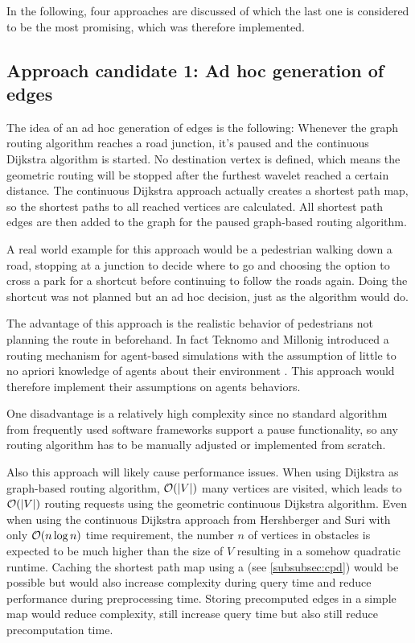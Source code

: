 	In the following, four approaches are discussed of which the last one is considered to be the most promising, which was therefore implemented.
	
	\subsection{Approach candidate 1: Ad hoc generation of edges}
	
		The idea of an ad hoc generation of edges is the following:
		Whenever the graph routing algorithm reaches a road junction, it's paused and the continuous Dijkstra algorithm is started.
		No destination vertex is defined, which means the geometric routing will be stopped after the furthest wavelet reached a certain distance.
		The continuous Dijkstra approach actually creates a shortest path map, so the shortest paths to all reached vertices are calculated.
		All shortest path edges are then added to the graph for the paused graph-based routing algorithm.
		
		A real world example for this approach would be a pedestrian walking down a road, stopping at a junction to decide where to go and choosing the option to cross a park for a shortcut before continuing to follow the roads again.
		Doing the shortcut was not planned but an ad hoc decision, just as the algorithm would do.
		
		The advantage of this approach is the realistic behavior of pedestrians not planning the route in beforehand.
		In fact Teknomo and Millonig introduced a routing mechanism for agent-based simulations with the assumption of little to no apriori knowledge of agents about their environment \cite{teknomo-millonig-routing}.
		This approach would therefore implement their assumptions on agents behaviors.
		
		One disadvantage is a relatively high complexity since no standard algorithm from frequently used software frameworks support a pause functionality, so any routing algorithm has to be manually adjusted or implemented from scratch.
		
		Also this approach will likely cause performance issues.
		When using Dijkstra as graph-based routing algorithm, $\mathcal{O}(|V|)$ many vertices are visited, which leads to $\mathcal{O}(|V|)$ routing requests using the geometric continuous Dijkstra algorithm.
		Even when using the continuous Dijkstra approach from Hershberger and Suri \cite{hershberger-suri} with only $\mathcal{O}(n \log n)$ time requirement, the number $n$ of vertices in obstacles is expected to be much higher than the size of $V$ resulting in a somehow quadratic runtime.
		Caching the shortest path map using a  (see \cref{subsubsec:cpd}) would be possible but would also increase complexity during query time and reduce performance during preprocessing time.
		Storing precomputed edges in a simple map would reduce complexity, still increase query time but also still reduce precomputation time.
		
